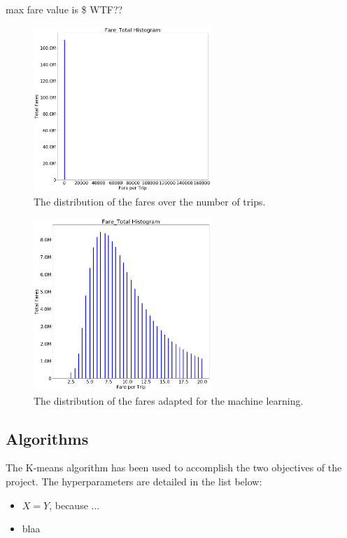\documentclass[a4paper]{article}
\begin{document}
max fare value is \$ WTF?? 

\begin{figure}
  \centering
  \includegraphics[width=0.6\textwidth]{images/distribution-fares-bad.png}
  \caption{The distribution of the fares over the number of trips.}
  \label{fig:distribution-fares-bad}
\end{figure}

\begin{figure}
  \centering
  \includegraphics[width=0.6\textwidth]{images/distribution-fares-fix.png}
  \caption{The distribution of the fares adapted for the machine learning.}
  \label{fig:distribution-fares-fixed}
\end{figure}


\subsection{Algorithms}
The K-means algorithm has been used to accomplish the two objectives of the project. The hyperparameters are detailed in the list below:

\begin{itemize}
  \item $X=Y$, because ...
  \item blaa
\end{itemize}
\end{document}
